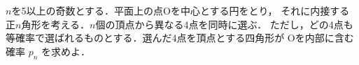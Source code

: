 ﻿\documentclass[../../../uem_tok_q.tex]{subfiles}
\begin{document}
    $n$を5以上の奇数とする．平面上の点Oを中心とする円をとり，%
    それに内接する正$n$角形を考える．$n$個の頂点から異なる4点を同時に選ぶ．%
    ただし，どの4点も等確率で選ばれるものとする．選んだ4点を頂点とする四角形が%
    Oを内部に含む確率 $p_n$ を求めよ．
\end{document}
